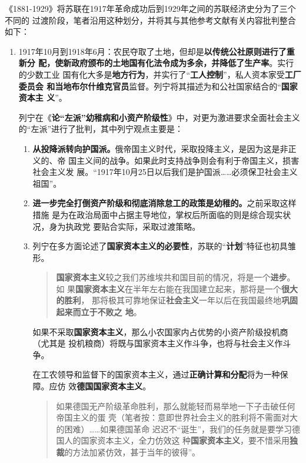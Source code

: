 《1881-1929》将苏联在1917年革命成功后到1929年之间的苏联经济史分为了三个不同的
过渡阶段，笔者沿用这种划分，并将其与其他参考文献有关内容批判整合如下：
\begin{enumerate}
\item 1917年10月到1918年6月：农民夺取了土地，但却是\textbf{以传统公社原则进行了重新分
    配，使新政府颁布的土地国有化法令成为多余，并降低了生产率}。实行的少数工业
  国有化大多是\textbf{地方行为}，并实行了“\textbf{工人控制}”，私人资本家受\textbf{工厂委员会
    和当地布尔什维克官员}监督。列宁将其描述为和公社国家结合的“\textbf{国家资本主
    义}”。

  列宁在《\textbf{论“左派”幼稚病和小资产阶级性}》中，对更为激进要求全面社会主义
  的“左派”进行了批判，其中列宁观点主要是：
  \begin{enumerate}
  \item \textbf{从投降派转向护国派。}俄帝国主义时代，采取投降主义，是因为这是非正义的、帝
    国主义间的战争。如果此时支持战争则会有利于帝国主义，损害社会主义发
    展。“1917年10月25日以后我们是护国派……必须保卫社会主义祖国”。

  \item \textbf{进一步完全打倒资产阶级和彻底消除怠工的政策是幼稚的。}之前采取这样措施
    是为在政治局面中占据主导地位，掌权后所面临的则是综合现实状况，身为执政党
    要贴合实际，采取过渡策略。

  \item 列宁在多方面论述了\textbf{国家资本主义的必要性}，苏联的“\textbf{计划}”特征也初具雏形。
    \begin{quotation}
      \textbf{国家资本主义}较之我们苏维埃共和国目前的情况，将是一个\textbf{进步}。如
      果\textbf{国家资本主义}在半年左右能在我国建立起来，那将是一个\textbf{很大的胜利}，
      那将极其可靠地保证\textbf{社会主义}一年以后在我国最终地\textbf{巩固起来而立于不败之
        地}。
    \end{quotation}
    如果不采取\textbf{国家资本主义}，那么小农国家内占优势的小资产阶级投机商（尤其是
    投机粮商）将既与国家资本主义作斗争，也将与社会主义作斗争。

    在工农领导和监督下的国家资本主义，通过\textbf{正确计算和分配}将为一种保障。应仿
    效\textbf{德国国家资本主义}。
    \begin{quotation}
      如果德国无产阶级革命胜利，那么就能轻而易举地一下子击破任何帝国主义的蛋
      壳（笔者按：意即世界社会主义的胜利将不需面对大的困难）……如果德国革命
      迟迟不“诞生”，我们的任务就是要学习德国人的国家资本主义，全力仿效这
      种\textbf{国家资本主义}，要不惜采用\textbf{独裁}的方法加紧仿效，甚于当年的彼得”。
    \end{quotation}
  \end{enumerate}


\end{enumerate}
